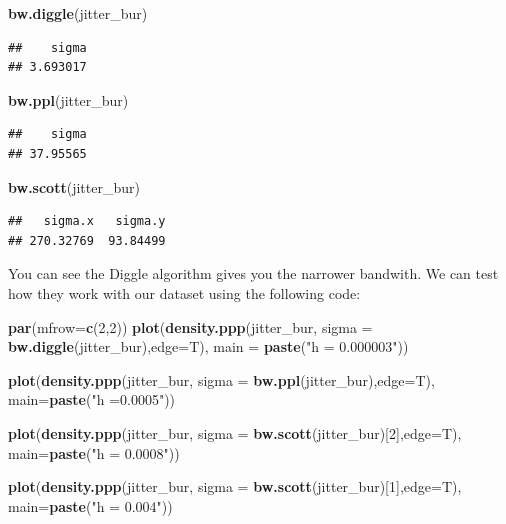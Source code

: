 \documentclass[]{book}
\newenvironment{Shaded}{\begin{snugshade}}{\end{snugshade}}
\newcommand{\DataTypeTok}[1]{\textcolor[rgb]{0.13,0.29,0.53}{#1}}
\newcommand{\DecValTok}[1]{\textcolor[rgb]{0.00,0.00,0.81}{#1}}
\newcommand{\KeywordTok}[1]{\textcolor[rgb]{0.13,0.29,0.53}{\textbf{#1}}}
\newcommand{\NormalTok}[1]{#1}
\newcommand{\StringTok}[1]{\textcolor[rgb]{0.31,0.60,0.02}{#1}}
\begin{document}
\begin{Shaded}
\begin{Highlighting}[]
\KeywordTok{bw.diggle}\NormalTok{(jitter_bur)}
\end{Highlighting}
\end{Shaded}

\begin{verbatim}
##    sigma 
## 3.693017
\end{verbatim}

\begin{Shaded}
\begin{Highlighting}[]
\KeywordTok{bw.ppl}\NormalTok{(jitter_bur)}
\end{Highlighting}
\end{Shaded}

\begin{verbatim}
##    sigma 
## 37.95565
\end{verbatim}

\begin{Shaded}
\begin{Highlighting}[]
\KeywordTok{bw.scott}\NormalTok{(jitter_bur)}
\end{Highlighting}
\end{Shaded}

\begin{verbatim}
##   sigma.x   sigma.y 
## 270.32769  93.84499
\end{verbatim}

You can see the Diggle algorithm gives you the narrower bandwith. We can test how they work with our dataset using the following code:

\begin{Shaded}
\begin{Highlighting}[]
\KeywordTok{par}\NormalTok{(}\DataTypeTok{mfrow=}\KeywordTok{c}\NormalTok{(}\DecValTok{2}\NormalTok{,}\DecValTok{2}\NormalTok{))}
\KeywordTok{plot}\NormalTok{(}\KeywordTok{density.ppp}\NormalTok{(jitter_bur, }\DataTypeTok{sigma =} \KeywordTok{bw.diggle}\NormalTok{(jitter_bur),}\DataTypeTok{edge=}\NormalTok{T),}
     \DataTypeTok{main =} \KeywordTok{paste}\NormalTok{(}\StringTok{"h = 0.000003"}\NormalTok{))}

\KeywordTok{plot}\NormalTok{(}\KeywordTok{density.ppp}\NormalTok{(jitter_bur, }\DataTypeTok{sigma =} \KeywordTok{bw.ppl}\NormalTok{(jitter_bur),}\DataTypeTok{edge=}\NormalTok{T),}
     \DataTypeTok{main=}\KeywordTok{paste}\NormalTok{(}\StringTok{"h =0.0005"}\NormalTok{))}

\KeywordTok{plot}\NormalTok{(}\KeywordTok{density.ppp}\NormalTok{(jitter_bur, }\DataTypeTok{sigma =} \KeywordTok{bw.scott}\NormalTok{(jitter_bur)[}\DecValTok{2}\NormalTok{],}\DataTypeTok{edge=}\NormalTok{T),}
     \DataTypeTok{main=}\KeywordTok{paste}\NormalTok{(}\StringTok{"h = 0.0008"}\NormalTok{))}

\KeywordTok{plot}\NormalTok{(}\KeywordTok{density.ppp}\NormalTok{(jitter_bur, }\DataTypeTok{sigma =} \KeywordTok{bw.scott}\NormalTok{(jitter_bur)[}\DecValTok{1}\NormalTok{],}\DataTypeTok{edge=}\NormalTok{T),}
     \DataTypeTok{main=}\KeywordTok{paste}\NormalTok{(}\StringTok{"h = 0.004"}\NormalTok{))}
\end{Highlighting}
\end{Shaded}
\end{document}
